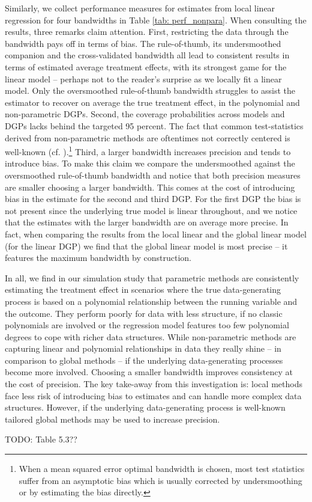 Similarly, we collect performance measures for estimates from local linear regression for four bandwidths in Table \ref{tab: perf_nonpara}. When consulting the results, three remarks claim attention. First, restricting the data through the bandwidth pays off in terms of bias. The rule-of-thumb, its undersmoothed companion and the cross-validated bandwidth all lead to consistent results in terms of estimated average treatment effects, with its strongest game for the linear model -- perhaps not to the reader's surprise as we locally fit a linear model. Only the oversmoothed rule-of-thumb bandwidth struggles to assist the estimator to recover on average the true treatment effect, in the polynomial and non-parametric DGPs. Second, the coverage probabilities across models and DGPs lacks behind the targeted 95 percent. The fact that common test-statistics derived from non-parametric methods are oftentimes not correctly centered is well-known (cf. \cite{wasserman}).\footnote{When a mean squared error optimal bandwidth is chosen, most test statistics suffer from an asymptotic bias which is usually corrected by undersmoothing or by estimating the bias directly.} Third, a larger bandwidth increases precision and tends to introduce bias. To make this claim we compare the undersmoothed against the oversmoothed rule-of-thumb bandwidth and notice that both precision measures are smaller choosing a larger bandwidth. This comes at the cost of introducing bias in the estimate for the second and third DGP. For the first DGP the bias is not present since the underlying true model is linear throughout, and we notice that the estimates with the larger bandwidth are on average more precise. In fact, when comparing the results from the local linear and the global linear model (for the linear DGP) we find that the global linear model is most precise -- it features the maximum bandwidth by construction.

In all, we find in our simulation study that parametric methods are consistently estimating the treatment effect in scenarios where the true data-generating process is based on a polynomial relationship between the running variable and the outcome. They perform poorly for data with less structure, if no classic polynomials are involved or the regression model features too few polynomial degrees to cope with richer data structures. While non-parametric methods are capturing linear and polynomial relationships in data they really shine -- in comparison to global methods -- if the underlying data-generating processes become more involved. Choosing a smaller bandwidth improves consistency at the cost of precision. The key take-away from this investigation is: local methods face less risk of introducing bias to estimates and can handle more complex data structures. However, if the underlying data-generating process is well-known tailored global methods may be used to increase precision.



TODO: Table 5.3??









